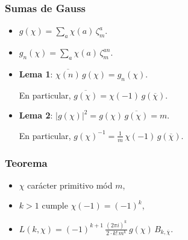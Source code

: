 \documentclass{beamer}
\begin{document}

\begin{frame}
  \frametitle{Sumas de Gauss}

  \begin{itemize}
  \item<1-> $g (\chi) = \sum_a \chi (a) \, \zeta_m^a$.

  \item<2-> $g_n (\chi) = \sum_a \chi (a) \, \zeta_m^{an}$.

  \item<3-> \textbf{Lema 1}: $\overline{\chi (n)} \, g (\chi) = g_n (\chi)$.

    En particular, $\overline{g (\chi)} = \chi (-1)\,g (\overline{\chi})$.

  \item<4-> \textbf{Lema 2}: $|g (\chi)|^2 = g (\chi)\,\overline{g (\chi)} = m$.

  En particular,
  $g (\chi)^{-1} = \frac{1}{m}\,\chi (-1)\,g (\overline{\chi})$.
  \end{itemize}
\end{frame}


\begin{frame}
  \frametitle{Teorema}

  \begin{itemize}
  \item<1-> $\chi$ carácter primitivo mód $m$,

  \item<2-> $k > 1$ cumple $\chi (-1) = (-1)^k$,

  \item<3-> $L (k,\chi) = (-1)^{k+1} \, \frac{(2\pi i)^k}{2\cdot k! \, m^k}\,g (\chi)\,B_{k,\overline{\chi}}$.
  \end{itemize}
\end{frame}

\end{document}
